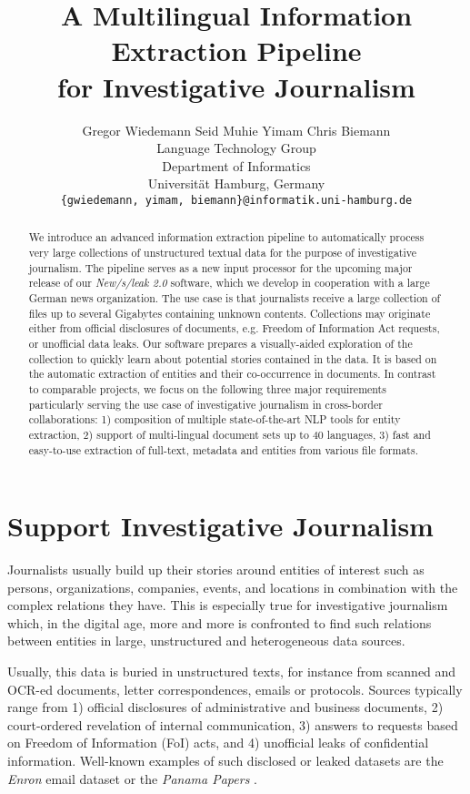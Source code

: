 \documentclass[11pt,a4paper]{article}
\title{A Multilingual Information Extraction Pipeline\\ for Investigative Journalism}
\author{Gregor Wiedemann \qquad Seid Muhie Yimam \qquad Chris Biemann \\
Language Technology Group\\ 
Department of Informatics\\ 
Universit\"{a}t Hamburg, Germany\\
 {\tt \{gwiedemann, yimam, biemann\}@informatik.uni-hamburg.de}
}
\date{}
\begin{document}
\maketitle
\begin{abstract}
We introduce an advanced information extraction pipeline to automatically process very large collections of unstructured textual data for the purpose of investigative journalism.
The pipeline serves as a new input processor for the upcoming major release of our \emph{New/s/leak 2.0} software,  which we develop in cooperation with a large German news organization. 
The use case is that journalists receive a large collection of files up to several Gigabytes containing unknown contents. Collections may originate either from official disclosures of documents, e.g. Freedom of Information Act requests, or unofficial data leaks. 
Our software prepares a visually-aided exploration of the collection to quickly learn about potential stories contained in the data.
It is based on the automatic extraction of entities and their co-occurrence in documents.
In contrast to comparable projects, we focus on the following three major requirements particularly serving the use case of investigative journalism in cross-border collaborations: 1) composition of multiple state-of-the-art NLP tools for entity extraction, 2) support of multi-lingual document sets up to 40 languages, 3) fast and easy-to-use extraction of full-text, metadata and entities from various file formats.
\end{abstract}

\section{Support Investigative Journalism}

Journalists usually build up their stories around entities of interest such as persons, organizations, companies, events, and locations in combination with the complex relations they have. This is especially true for investigative journalism which, in the digital age, more and more is confronted to find such relations between entities in large, unstructured and heterogeneous data sources. 

Usually, this data is buried in unstructured texts, for instance from scanned and OCR-ed documents, letter correspondences, emails or protocols. Sources typically range from 1) official disclosures of administrative and business documents, 2) court-ordered revelation of internal communication, 3) answers to requests based on Freedom of Information (FoI) acts, and 4) unofficial leaks of confidential information. Well-known examples of such disclosed or leaked datasets are the \emph{Enron} email dataset \cite{Keila.2005b} or the \emph{Panama Papers} \cite{ODonovan.2016}.
\end{document}
